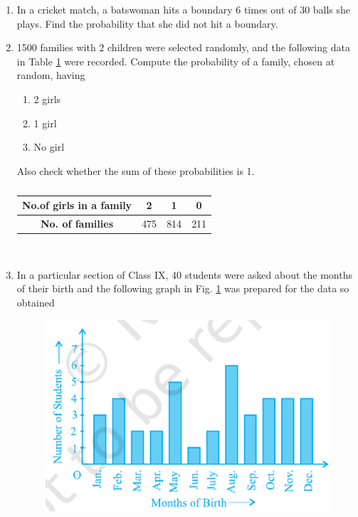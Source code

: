 \renewcommand{\theequation}{\theenumi}
\begin{enumerate}[label=\arabic*.,ref=\thesubsection.\theenumi]
	\item In a cricket match, a batswoman hits a boundary 6 times out of 30 balls she plays. Find the probability that she did not hit a boundary.
\\
\solution

    \item 1500 families with 2 children were selected randomly, and the following data in Table \ref{table:1.2.2} were recorded.
Compute the probability of a family, chosen at random, having
\begin{enumerate}
\item 2 girls
\item  1 girl
\item  No girl
\end{enumerate}
Also check whether the sum of these probabilities is 1.
\begin{table}[!ht]
\centering
\begin{tabular}{ |c|c|c|c| } 
 \hline
 \textbf{No.of girls in a family} &2 &1 &0\\ 
 \hline
 \textbf{No. of families}  &475 &814 &211\\ 
 \hline 
\end{tabular}
\caption{}
\label{table:1.2.2}
\end{table}
\\
\solution


\item In a particular section of Class IX, 40 students were asked about the months of their birth and the following graph in Fig. \ref{fig:1.2.3}
was prepared for the data so obtained
\begin{figure}[!ht]
\centering
\includegraphics[width=\columnwidth]{./prob/figs/1.2.3.eps}
\caption{}
\label{fig:1.2.3}
\end{figure}
    

\end{enumerate}
